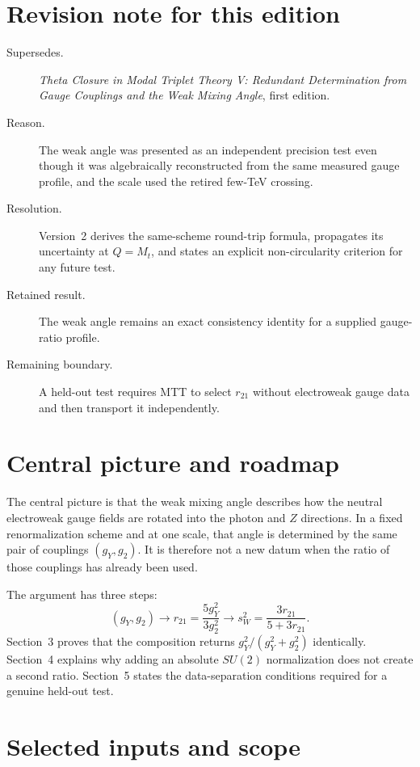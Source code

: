 \documentclass[11pt]{article}
\begin{document}
\section*{Revision note for this edition}
\begin{description}
\item[Supersedes.] \emph{Theta Closure in Modal Triplet Theory V: Redundant
Determination from Gauge Couplings and the Weak Mixing Angle}, first edition.
\item[Reason.] The weak angle was presented as an independent precision test
even though it was algebraically reconstructed from the same measured gauge
profile, and the scale used the retired few-TeV crossing.
\item[Resolution.] Version~2 derives the same-scheme round-trip formula,
propagates its uncertainty at $Q=M_t$, and states an explicit non-circularity
criterion for any future test.
\item[Retained result.] The weak angle remains an exact consistency identity
for a supplied gauge-ratio profile.
\item[Remaining boundary.] A held-out test requires MTT to select $r_{21}$
without electroweak gauge data and then transport it independently.
\end{description}

\section{Central picture and roadmap}

The central picture is that the weak mixing angle describes how the neutral
electroweak gauge fields are
rotated into the photon and $Z$ directions. In a fixed renormalization scheme
and at one scale, that angle is determined by the same pair of couplings
$(g_Y,g_2)$. It is therefore not a new datum when the ratio of those couplings
has already been used.

The argument has three steps:
\[
(g_Y,g_2)
\longrightarrow
r_{21}=\frac{5g_Y^2}{3g_2^2}
\longrightarrow
s_W^2=\frac{3r_{21}}{5+3r_{21}}.
\]
Section~3 proves that the composition returns
$g_Y^2/(g_Y^2+g_2^2)$ identically. Section~4 explains why adding an absolute
$SU(2)$ normalization does not create a second ratio. Section~5 states the
data-separation conditions required for a genuine held-out test.

\section{Selected inputs and scope}
\end{document}
